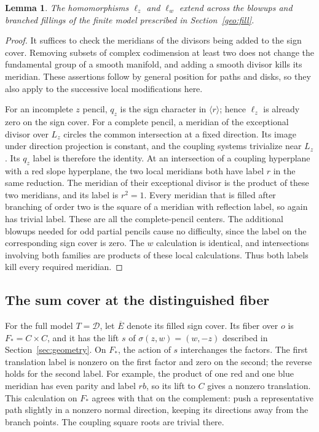\documentclass[11pt,reqno]{amsart}
\numberwithin{equation}{section}
\newtheorem{lemma}[theorem]{Lemma}
\theoremstyle{definition}
\theoremstyle{remark}
\newcommand{\cD}{\mathcal D}
\begin{document}
\begin{lemma}\label{mod:extension}
The homomorphisms $\ell_z$ and $\ell_w$ extend across the blowups and
branched fillings of the finite model prescribed in
Section~\ref{geo:fill}.
\end{lemma}
\begin{proof}
It suffices to check the meridians of the divisors being added to the
sign cover.  Removing subsets of complex codimension at least two
does not change the fundamental group of a smooth manifold, and
adding a smooth divisor kills its meridian.  These assertions follow
by general position for paths and disks, so they also apply to the
successive local modifications here.

For an incomplete $z$ pencil, $q_z$ is the sign character in
$\langle r\rangle$; hence $\ell_z$ is already zero on the sign cover.
For a complete pencil, a meridian of the exceptional divisor over
$L_z$ circles the common intersection at a fixed direction.  Its
image under direction projection is constant, and the coupling
systems trivialize near $L_z$.  Its $q_z$ label is therefore the
identity.  At an intersection of a coupling hyperplane with a red
slope hyperplane, the two local meridians both have label $r$ in the
same reduction.  The meridian of their exceptional divisor is the
product of these two meridians, and its label is $r^2=1$.  Every
meridian that is filled after branching of order two is the square
of a meridian with reflection label, so again has trivial label.
These are all the complete-pencil centers.  The additional blowups
needed for odd partial pencils cause no difficulty, since the label
on the corresponding sign cover is zero.  The $w$ calculation is
identical, and intersections involving both families are products
of these local calculations.  Thus both labels kill every required
meridian.
\end{proof}

\subsection{The sum cover at the distinguished fiber}

For the full model $T=\cD$, let $\overline E$ denote its filled sign
cover.  Its fiber over $o$ is $F_*=C\times C$, and it has the lift
$s$ of $\sigma(z,w)=(w,-z)$ described in Section~\ref{sec:geometry}.
On $F_*$, the action of $s$ interchanges the factors.  The first
translation label is nonzero on the first factor and zero on the
second; the reverse holds for the second label.  For example, the
product of one red and one blue meridian has even parity and label
$rb$, so its lift to $C$ gives a nonzero translation.  This calculation
on $F_*$ agrees with that on the complement: push a representative
path slightly in a nonzero normal direction, keeping its directions
away from the branch points.  The coupling square roots are
trivial there.
\end{document}
